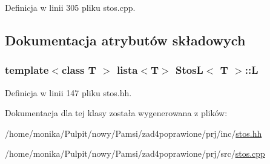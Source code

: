 \-Definicja w linii 305 pliku stos.\-cpp.



\subsection{\-Dokumentacja atrybutów składowych}
\hypertarget{class_stos_l_ac18d4c73355b3e6a9ad47aedae6a77ca}{
\subsubsection[{\-L}]{\setlength{\rightskip}{0pt plus 5cm}template$<$class T $>$ {\bf lista}$<$\-T$>$ {\bf \-Stos\-L}$<$ \-T $>$\-::{\bf \-L}}}\label{class_stos_l_ac18d4c73355b3e6a9ad47aedae6a77ca}


\-Definicja w linii 147 pliku stos.\-hh.



\-Dokumentacja dla tej klasy została wygenerowana z plików\-:\begin{DoxyCompactItemize}
\item 
/home/monika/\-Pulpit/nowy/\-Pamsi/zad4poprawione/prj/inc/\hyperlink{stos_8hh}{stos.\-hh}\item 
/home/monika/\-Pulpit/nowy/\-Pamsi/zad4poprawione/prj/src/\hyperlink{stos_8cpp}{stos.\-cpp}\end{DoxyCompactItemize}
